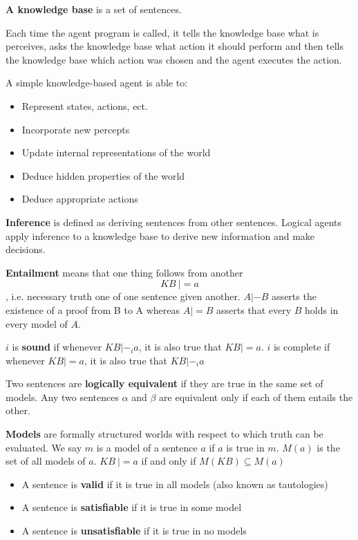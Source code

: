\documentclass{article}
\begin{document}
\textbf{A knowledge base} is a set of sentences.

Each time the agent program is called, it tells the knowledge base what is perceives, asks the knowledge base what action it should perform and then tells the knowledge base which action was chosen and the agent executes the action. 

A simple knowledge-based agent is able to:
\begin{itemize}
    \item Represent states, actions, ect.
    \item Incorporate new percepts
    \item Update internal representations of the world 
    \item Deduce hidden properties of the world 
    \item Deduce appropriate actions
\end{itemize}

\textbf{Inference} is defined as deriving sentences from other sentences. Logical agents apply inference to a knowledge base to derive new information and make decisions. \newline


\textbf{Entailment} means that one thing follows from another $$KB \: |= a$$, i.e. necessary truth one of one sentence given another. $A |- B$ asserts the existence of a proof from B to A whereas $A |= B$  asserts that every $B$ holds in every model of $A$. \newline 

$i$ is \textbf{sound} if whenever $KB |-_i a$, it is also true that $KB |= a$. $i$ is complete if whenever $KB |= a$, it is also true that $KB |-_i a$

Two sentences are \textbf{logically equivalent} if they are true in the same set of models. Any two sentences $\alpha$ and $\beta$ are equivalent only if each of them entails the other. 

\textbf{Models} are formally structured worlds with respect to which truth can be evaluated. We say $m$ is a model of a sentence $a$ if $a$ is true in $m$. $M(a)$ is the set of all models of $a$. $KB \ |= a$ if and only if $M(KB) \subseteq M(a)$ 

\begin{itemize}
    \item A sentence is \textbf{valid} if it is true in all models (also known as tautologies)
    \item A sentence is \textbf{satisfiable} if it is true in some model
    \item A sentence is \textbf{unsatisfiable} if it is true in no models 
\end{itemize}
\end{document}
